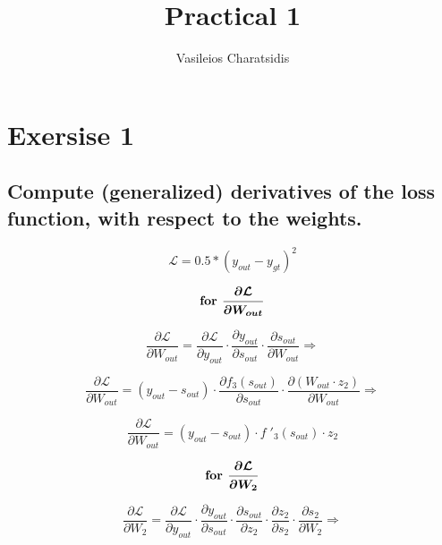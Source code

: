 \documentclass[a4paper]{article}
\title{Practical 1}
\author{Vasileios Charatsidis}
\begin{document}
\maketitle

\section{Exersise 1}
\subsection{Compute (generalized) derivatives of the loss function, with respect to the weights.}
\begin{equation}
\mathcal{L} = 0.5 * (y_{out} - y_{gt})^2
\end{equation}

\begin{equation} \mbox{\textbf{for }} \boldsymbol{\frac{\partial \mathcal{L}}{\partial W_{out}}} \nonumber \end{equation}

\begin{equation}
\frac{\partial \mathcal{L}}{\partial W_{out}} = \frac{\partial \mathcal{L}}{\partial y_{out}} \cdot \frac{\partial y_{out}}{\partial s_{out}} \cdot \frac{\partial s_{out}}{\partial W_{out}}  \Rightarrow
\end{equation}

\begin{equation}
\frac{\partial \mathcal{L}}{\partial W_{out}} = (y_{out} - s_{out}) \cdot \frac{\partial f_{3}(s_{out})}{\partial s_{out}} \cdot \frac{\partial (W_{out} \cdot z_2)}{\partial W_{out}}  \Rightarrow
\nonumber \end{equation}

\begin{equation}
\frac{\partial \mathcal{L}}{\partial W_{out}} = (y_{out} - s_{out}) \cdot  f\;'_{3}(s_{out}) \cdot z_2 
\nonumber \end{equation}

\begin{equation} \mbox{\textbf{for }} \boldsymbol{\frac{\partial \mathcal{L}}{\partial W_{2}}} \nonumber \end{equation}

\begin{equation}
\frac{\partial \mathcal{L}}{\partial W_{2}} = \frac{\partial \mathcal{L}}{\partial y_{out}} \cdot \frac{\partial y_{out}}{\partial s_{out}} \cdot \frac{\partial s_{out}}{\partial z_{2}} \cdot \frac{\partial z_{2}}{\partial s_{2}} \cdot \frac{\partial s_{2}}{\partial W_{2}} \Rightarrow
\end{equation}
\end{document}
